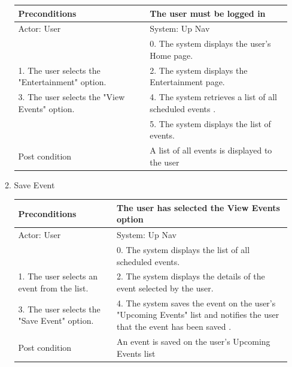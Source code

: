 \documentclass{article}
\begin{document}
\begin{center}
\begin{enumerate}
\begin{enumerate}
	\begin{table}[]
	\centering
		\begin{tabular}{ | m{15em} | m{15em}| }
		\hline
		Preconditions                                                       				& The user must be logged in \\ 				
		\hline
		Actor: User                                                       					& System: Up Nav \\ 			
		\hline
                                                                  							& 0. The system displays the user's Home page. \\                                                           
		 \hline
		1. The user selects the "Entertainment" option.				& 2. The system displays the Entertainment  page. \\
		 \hline
		3. The user selects the "View Events" option. 					& 4.  The system retrieves a list of all scheduled events . \\
		\hline
													& 5. The system displays the list of events. \\
		\hline
		Post condition                                                     				& A list of all events is displayed to the user \\ 			
		\hline
		\end{tabular}
	\end{table}

	\item{Save Event}

	\begin{table}[]
	\centering
		\begin{tabular}{ | m{15em} | m{15em}| }
		\hline
		Preconditions                                                       				& The user has selected the View Events option \\ 				
		\hline
		Actor: User                                                       					& System: Up Nav \\ 			
		\hline
                                                                  							& 0. The system displays the list of all scheduled events. \\                                                           
		 \hline
		1. The user selects an event from the list.					& 2. The system displays the details of the event selected by the user. \\
		 \hline
		3. The user selects the "Save Event" option. 					& 4.  The system saves the event on the user's "Upcoming Events" list and notifies the user that the event has been saved . \\
		\hline
		Post condition                                                     				& An event is saved on the user's Upcoming Events list \\ 			
		\hline
		\end{tabular}
	\end{table}


\end{enumerate}
\end{enumerate}
\end{center}
\end{document}
